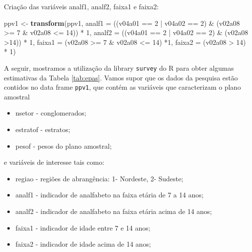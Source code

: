 \documentclass[]{book}
\newenvironment{Shaded}{\begin{snugshade}}{\end{snugshade}}
\newcommand{\KeywordTok}[1]{\textcolor[rgb]{0.13,0.29,0.53}{\textbf{{#1}}}}
\newcommand{\DataTypeTok}[1]{\textcolor[rgb]{0.13,0.29,0.53}{{#1}}}
\newcommand{\DecValTok}[1]{\textcolor[rgb]{0.00,0.00,0.81}{{#1}}}
\newcommand{\StringTok}[1]{\textcolor[rgb]{0.31,0.60,0.02}{{#1}}}
\newcommand{\NormalTok}[1]{{#1}}
\providecommand{\tightlist}{%
  \setlength{\itemsep}{0pt}\setlength{\parskip}{0pt}}
\theoremstyle{definition}
\theoremstyle{definition}
\theoremstyle{remark}
\begin{document}
Criação das variáveis analf1, analf2, faixa1 e faixa2:

\begin{Shaded}
\begin{Highlighting}[]
\NormalTok{ppv1 <-}\StringTok{ }\KeywordTok{transform}\NormalTok{(ppv1, }
\DataTypeTok{analf1 =} \NormalTok{((v04a01 ==}\StringTok{ }\DecValTok{2} \NormalTok{|}\StringTok{ }\NormalTok{v04a02 ==}\StringTok{ }\DecValTok{2}\NormalTok{) &}\StringTok{ }\NormalTok{(v02a08 >=}\StringTok{ }\DecValTok{7} \NormalTok{&}\StringTok{ }\NormalTok{v02a08 <=}\StringTok{ }\DecValTok{14}\NormalTok{)) *}\StringTok{ }\DecValTok{1}\NormalTok{, }
\DataTypeTok{analf2 =} \NormalTok{((v04a01 ==}\StringTok{ }\DecValTok{2} \NormalTok{|}\StringTok{ }\NormalTok{v04a02 ==}\StringTok{ }\DecValTok{2}\NormalTok{) &}\StringTok{ }\NormalTok{(v02a08 >}\DecValTok{14}\NormalTok{)) *}\StringTok{ }\DecValTok{1}\NormalTok{, }
\DataTypeTok{faixa1 =} \NormalTok{(v02a08 >=}\StringTok{ }\DecValTok{7} \NormalTok{&}\StringTok{ }\NormalTok{v02a08 <=}\StringTok{ }\DecValTok{14}\NormalTok{) *}\DecValTok{1}\NormalTok{, }
\DataTypeTok{faixa2 =} \NormalTok{(v02a08 >}\StringTok{ }\DecValTok{14}\NormalTok{) *}\StringTok{ }\DecValTok{1}\NormalTok{)}
\end{Highlighting}
\end{Shaded}

A seguir, mostramos a utilização da library \texttt{survey}
\citep{R-survey} do R para obter algumas estimativas da Tabela
\ref{tab:epas}. Vamos supor que os dados da pesquisa estão contidos no
data frame \texttt{ppv1}, que contém as variáveis que caracterizam o
plano amostral

\begin{itemize}
\tightlist
\item
  nsetor - conglomerados;
\item
  estratof - estratos;
\item
  pesof - pesos do plano amostral;
\end{itemize}

e variáveis de interesse tais como:

\begin{itemize}
\tightlist
\item
  regiao - regiões de abrangência: 1- Nordeste, 2- Sudeste;
\item
  analf1 - indicador de analfabeto na faixa etária de 7 a 14 anos;
\item
  analf2 - indicador de analfabeto na faixa etária acima de 14 anos;
\item
  faixa1 - indicador de idade entre 7 e 14 anos;
\item
  faixa2 - indicador de idade acima de 14 anos;
\end{itemize}
\end{document}

